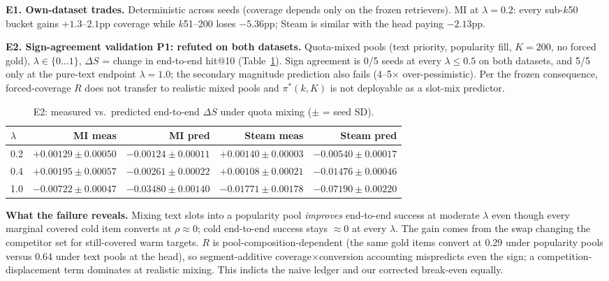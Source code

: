 \documentclass[sigconf,anonymous,review]{acmart}
\begin{document}
\textbf{E1. Own-dataset trades.} Deterministic across seeds (coverage depends only on the frozen retrievers). MI at $\lambda{=}0.2$: every sub-$k$50 bucket gains $+1.3$--$2.1$pp coverage while $k$51--200 loses $-5.36$pp; Steam is similar with the head paying $-2.13$pp.

\textbf{E2. Sign-agreement validation P1: refuted on both datasets.} Quota-mixed pools (text priority, popularity fill, $K{=}200$, no forced gold), $\lambda\in\{0\ldots 1\}$, $\Delta S$ = change in end-to-end hit@10 (Table~\ref{tab:e2}). Sign agreement is 0/5 seeds at every $\lambda\le 0.5$ on both datasets, and 5/5 only at the pure-text endpoint $\lambda{=}1.0$; the secondary magnitude prediction also fails (4--5$\times$ over-pessimistic). Per the frozen consequence, forced-coverage $R$ does not transfer to realistic mixed pools and $\pi^*(k,K)$ is not deployable as a slot-mix predictor.

\begin{table}[t]
\caption{E2: measured vs.\ predicted end-to-end $\Delta S$ under quota mixing ($\pm$ = seed SD).}
\label{tab:e2}
\small
\begin{tabular}{lrrrr}
\toprule
$\lambda$ & MI meas & MI pred & Steam meas & Steam pred\\
\midrule
0.2 & $\mathbf{+0.00129}\pm0.00050$ & $-0.00124\pm0.00011$ & $\mathbf{+0.00140}\pm0.00003$ & $-0.00540\pm0.00017$\\
0.4 & $\mathbf{+0.00195}\pm0.00057$ & $-0.00261\pm0.00022$ & $+0.00108\pm0.00021$ & $-0.01476\pm0.00046$\\
1.0 & $-0.00722\pm0.00047$ & $-0.03480\pm0.00140$ & $-0.01771\pm0.00178$ & $-0.07190\pm0.00220$\\
\bottomrule
\end{tabular}
\end{table}

\textbf{What the failure reveals.} Mixing text slots into a popularity pool \emph{improves} end-to-end success at moderate $\lambda$ even though every marginal covered cold item converts at $\rho\approx 0$; cold end-to-end success stays $\approx 0$ at every $\lambda$. The gain comes from the swap changing the competitor set for still-covered warm targets. $R$ is pool-composition-dependent (the same gold items convert at 0.29 under popularity pools versus 0.64 under text pools at the head), so segment-additive coverage$\times$conversion accounting mispredicts even the sign; a competition-displacement term dominates at realistic mixing. This indicts the naive ledger and our corrected break-even equally.
\end{document}
